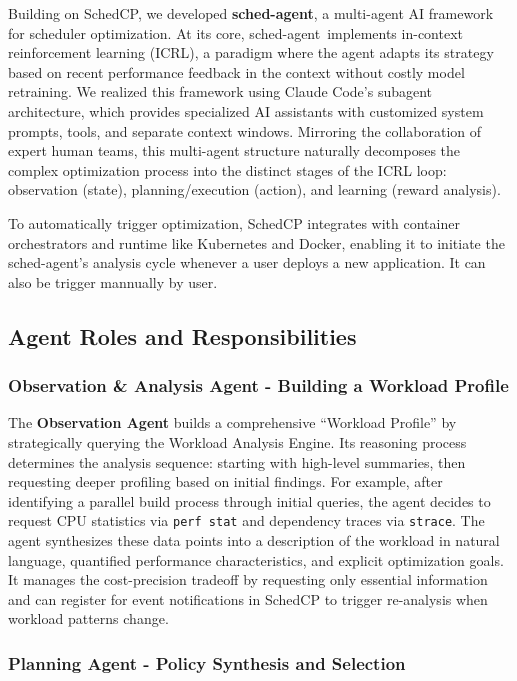 \documentclass[preprint]{article}
\newcommand{\sys}{SchedCP\xspace}
\newcommand{\agent}{sched-agent\xspace}
\begin{document}
Building on \sys, we developed \textbf{\agent}, a multi-agent AI framework for scheduler optimization. At its core, \agent\ implements in-context reinforcement learning (ICRL)\cite{incontextrl}, a paradigm where the agent adapts its strategy based on recent performance feedback in the context without costly model retraining. We realized this framework using Claude Code's subagent architecture\cite{anthropic2024subagents}, which provides specialized AI assistants with customized system prompts, tools, and separate context windows\cite{anthropic2024multiagent}. Mirroring the collaboration of expert human teams, this multi-agent structure naturally decomposes the complex optimization process into the distinct stages of the ICRL loop: observation (state), planning/execution (action), and learning (reward analysis).

To automatically trigger optimization, \sys integrates with container orchestrators and runtime like Kubernetes and Docker, enabling it to initiate the \agent's analysis cycle whenever a user deploys a new application. It can also be trigger mannually by user.

\subsection{Agent Roles and Responsibilities}

\subsubsection{Observation \& Analysis Agent - Building a Workload Profile}

The \textbf{Observation Agent} builds a comprehensive ``Workload Profile'' by strategically querying the Workload Analysis Engine. Its reasoning process determines the analysis sequence: starting with high-level summaries, then requesting deeper profiling based on initial findings. For example, after identifying a parallel build process through initial queries, the agent decides to request CPU statistics via \texttt{perf stat} and dependency traces via \texttt{strace}. The agent synthesizes these data points into a description of the workload in natural language, quantified performance characteristics, and explicit optimization goals. It manages the cost-precision tradeoff by requesting only essential information and can register for event notifications in \sys to trigger re-analysis when workload patterns change.

\subsubsection{Planning Agent - Policy Synthesis and Selection}
\end{document}
